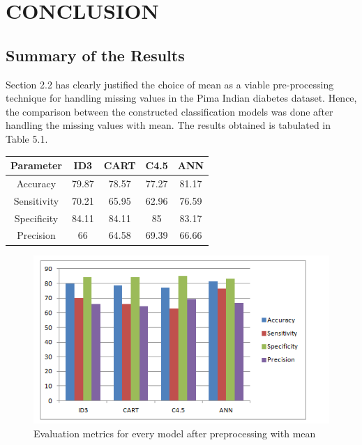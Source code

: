 \chapter{CONCLUSION}
\section{Summary of the Results}

Section 2.2 has clearly justified the choice of mean as a viable pre-processing technique for handling missing values in the Pima Indian diabetes dataset. Hence, the comparison between the constructed classification models was done after handling the missing values with mean. The results obtained is tabulated in Table 5.1.

\newline
\begin{center}
\begin{tabular}{|c|c|c|c|c|}
\hline
\textbf{Parameter} &	\textbf{ID3} & \textbf{CART} & \textbf{C4.5} &	\textbf{ANN} \\
\hline
Accuracy & 79.87 & 78.57 & 77.27 & 81.17\\
\hline
Sensitivity &	70.21 &	65.95 &	62.96 &	76.59\\
\hline
Specificity &	84.11 &	84.11 &	85 & 83.17\\
\hline
Precision	& 66 &	64.58 &	69.39 &	66.66\\
\hline
\end{tabular}
\end{center}

\begin{figure}[h]
\centering
\includegraphics[scale=1.0]{evalmetall.PNG}
\caption{\label{fig:subBDDs1}Evaluation metrics for every model after
preprocessing with mean}
\end{figure}
\pagebreak

